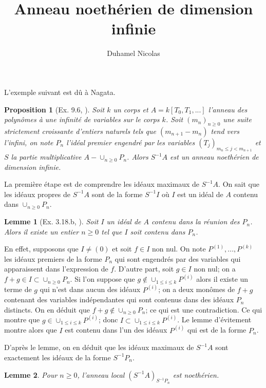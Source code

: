 \documentclass{article}
\newtheorem{proposition}{Proposition}
\newtheorem{lemme}{Lemme}
\begin{document}
\title{Anneau noethérien de dimension infinie}
\author{Duhamel Nicolas}
\maketitle

L'exemple suivant est dû à Nagata.
\begin{proposition}[Ex. 9.6, \cite{eisenbud}]
Soit $k$ un corps et $A = k[T_0, T_1, ...]$ l'anneau des polynômes à une infinité de variables sur le corps $k$. Soit $(m_n)_{n \geq 0}$ une suite strictement croissante d'entiers naturels tels que $( m_{n+1} - m_n )$ tend vers l'infini, on note $P_n$ l'idéal premier engendré par les variables $(T_j)_{m_n \leq j < m_{n+1}}$ et $S$ la partie multiplicative $A-\cup_{n \geq 0}P_n$. Alors $S^{-1}A$ est un anneau noethérien de dimension infinie.
\end{proposition}

La première étape est de comprendre les idéaux maximaux de $S^{-1}A$.
On sait que les idéaux propres de $S^{-1}A$ sont de la forme $S^{-1}I$ où $I$ est un idéal de $A$ contenu dans $\cup_{n \geq 0}P_n$.

\begin{lemme}[Ex. 3.18.b, \cite{eisenbud}]
Soit $I$ un idéal de $A$ contenu dans la réunion des $P_n$. Alors il existe un entier $n \geq 0$ tel que $I$ soit contenu dans $P_n$.
\end{lemme}

En effet, supposons que $I \neq (0)$ et soit $f \in I$ non nul. On note $P^{(1)}, ..., P^{(k)}$ les idéaux premiers de la forme $P_n$ qui sont engendrés par des variables qui apparaissent dans l'expression de $f$. D'autre part, soit $g \in I$ non nul; on a $f+g \in I \subset \cup_{n \geq 0}P_n$. Si l'on suppose que $g \not\in \cup_{1 \leq i \leq k}P^{(i)}$ alors il existe un terme de $g$ qui n'est dans aucun des idéaux $P^{(i)}$; on a deux monômes de $f+g$ contenant des variables indépendantes qui sont contenus dans des idéaux $P_n$ distincts. On en déduit que $f+g \not\in \cup_{n \geq 0}P_n$; ce qui est une contradiction. Ce qui montre que $g \in \cup_{1 \leq i \leq k}P^{(i)}$; donc $I \subset \cup_{1 \leq i \leq k}P^{(i)}$. Le lemme d'évitement montre alors que $I$ est contenu dans l'un des idéaux $P^{(i)}$ qui est de la forme $P_n$.

D'après le lemme, on en déduit que les idéaux maximaux de $S^{-1}A$ sont exactement les idéaux de la forme $S^{-1}P_n$.
\begin{lemme}
Pour $n \geq 0$, l'anneau local $(S^{-1}A)_{S^{-1}P_n}$ est noethérien.
\end{lemme}
\end{document}
